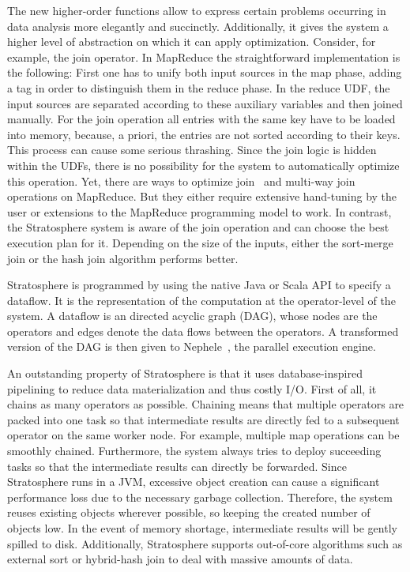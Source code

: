 The new higher-order functions allow to express certain problems occurring in data analysis more elegantly and succinctly.
Additionally, it gives the system a higher level of abstraction on which it can apply optimization.
Consider, for example, the join operator.
In MapReduce the straightforward implementation is the following:
First one has to unify both input sources in the map phase, adding a tag in order to distinguish them in the reduce phase.
In the reduce UDF, the input sources are separated according to these auxiliary variables and then joined manually.
For the join operation all entries with the same key have to be loaded into memory, because, a priori, the entries are not sorted according to their keys.
This process can cause some serious thrashing.
Since the join logic is hidden within the UDFs, there is no possibility for the system to automatically optimize this operation.
Yet, there are ways to optimize join~\cite{blanas:2010a} and multi-way join~\cite{afrati:2010a} operations on MapReduce.
But they either require extensive hand-tuning by the user or extensions to the MapReduce programming model to work.
In contrast, the Stratosphere system is aware of the join operation and can choose the best execution plan for it.
Depending on the size of the inputs, either the sort-merge join or the hash join algorithm performs better.

Stratosphere is programmed by using the native Java or Scala API to specify a dataflow.
It is the representation of the computation at the operator-level of the system.
A dataflow is an directed acyclic graph (DAG), whose nodes are the operators and edges denote the data flows between the operators.
A transformed version of the DAG is then given to Nephele~\cite{warneke:2009a}, the parallel execution engine.

An outstanding property of Stratosphere is that it uses database-inspired pipelining to reduce data materialization and thus costly I/O.
First of all, it chains as many operators as possible.
Chaining means that multiple operators are packed into one task so that intermediate results are directly fed to a subsequent operator on the same worker node.
For example, multiple map operations can be smoothly chained.
Furthermore, the system always tries to deploy succeeding tasks so that the intermediate results can directly be forwarded.
Since Stratosphere runs in a JVM, excessive object creation can cause a significant performance loss due to the necessary garbage collection.
Therefore, the system reuses existing objects wherever possible, so keeping the created number of objects low.
In the event of memory shortage, intermediate results will be gently spilled to disk.
Additionally, Stratosphere supports out-of-core algorithms such as external sort or hybrid-hash join to deal with massive amounts of data.


